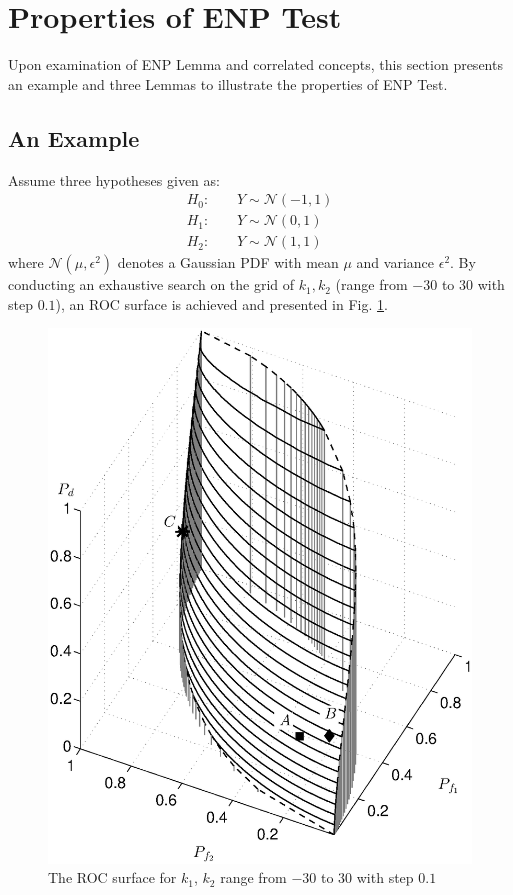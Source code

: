 
\section{Properties of ENP Test}
Upon examination of ENP Lemma and correlated concepts, this section presents an example and three Lemmas to illustrate the properties of ENP Test. 

\subsection{An Example}
Assume three hypotheses given as:
\begin{equation}
\begin{split}
H_0:\;\;\;\;&Y \sim \mathcal{N}(-1, 1)\\
H_1:\;\;\;\;&Y \sim \mathcal{N}(0, 1)\\
H_2:\;\;\;\;&Y \sim \mathcal{N}(1, 1)
\end{split}
\end{equation}
where $\mathcal{N}(\mu, \epsilon^2)$ denotes a Gaussian PDF with mean $\mu$ and variance $\epsilon^2$. By conducting an exhaustive search on the grid of $k_1, k_2$ (range from $-30$ to $30$ with step $0.1$), an ROC surface is achieved  and presented in Fig. \ref{fig: 2.1}. 

\begin{figure}[!hbp]
\centering
\includegraphics[width = \textwidth]{2/c21.eps}
\caption{The ROC surface for $k_1$, $k_2$ range from $-30$ to $30$ with step $0.1$}
\label{fig: 2.1}
\end{figure}

